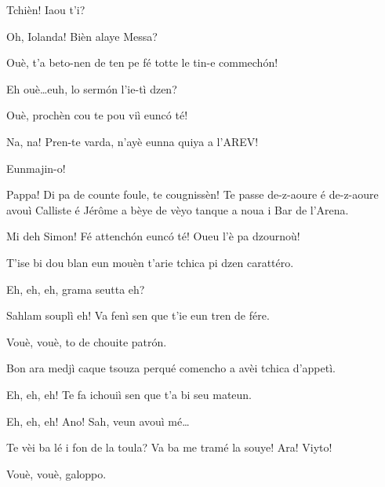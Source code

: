 \begin{drama}
\Iolandaspeaks {} Tchièn! Iaou t'i?


\Cienspeaks {} Oh, Iolanda! Bièn alaye Messa?

\Iolandaspeaks Ouè, t’a beto-nen de ten pe fé totte le tin-e commech\'on!

\Cienspeaks Eh ouè\ldots euh, lo serm\'on l'ie-tì dzen?

\Iolandaspeaks  Ouè, prochèn cou te pou viì eunc\'o té!

\Cienspeaks Na, na! Pren-te varda, n’ayè eunna quiya a l’AREV!

\Iolandaspeaks Eunmajin-o!

\Simonspeaks Pappa! Di pa de counte foule, te cougnissèn! Te passe de-z-aoure é de-z-aoure avouì Calliste é Jérôme a bèye de vèyo tanque a noua i Bar de l’Arena.

\Cienspeaks Mi deh Simon! Fé attench\'on eunc\'o té! Oueu l’è pa dzournoù!

\Iolandaspeaks T’ise bi dou blan eun mouèn t’arie tchica pi dzen carattéro.

\Sahlammspeaks {}  Eh, eh, eh, grama seutta eh?

\Cienspeaks Sahlam souplì eh! Va fenì sen que t’ie eun tren de fére.

\Sahlammspeaks Vouè, vouè, to de chouite patr\'on.


\Cienspeaks {} Bon ara medjì caque tsouza perqué comencho a avèi tchica d’appetì.

\Sahlammspeaks {} Eh, eh, eh! Te fa ichouiì sen que t’a bi seu mateun. 


\Cienspeaks {} Eh, eh, eh! Ano! Sah, veun avouì mé\ldots


\Cienspeaks {} Te vèi ba lé i fon de la toula? Va ba me tramé la souye! Ara! Viyto! 

\Sahlammspeaks Vouè, vouè, galoppo.


\end{drama}
